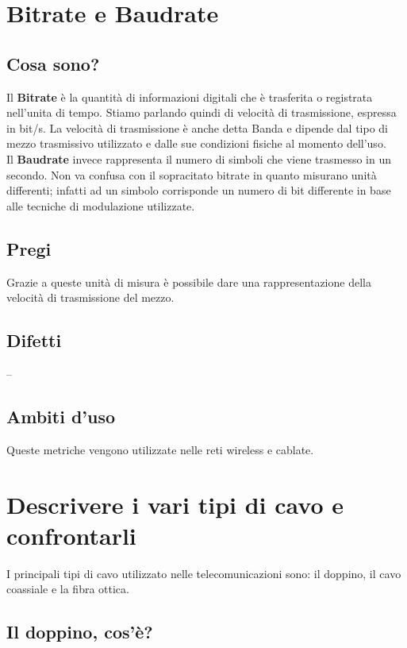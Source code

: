 \section{Bitrate e Baudrate}
\subsection{Cosa sono?}
Il \textbf{Bitrate} è la quantità di informazioni digitali che è trasferita o registrata nell’unita di tempo.
Stiamo parlando quindi di velocità di trasmissione, espressa in bit/s. La velocità di trasmissione è anche detta Banda e dipende dal tipo di mezzo trasmissivo utilizzato e dalle sue condizioni fisiche al momento dell’uso.
\\
Il \textbf{Baudrate} invece rappresenta il numero di simboli che viene trasmesso in un secondo. Non va confusa con il sopracitato bitrate in quanto misurano unità differenti; infatti ad un simbolo corrisponde un numero di bit differente in base alle tecniche di modulazione utilizzate.

\subsection{Pregi}
Grazie a queste unità di misura è possibile dare una rappresentazione della velocità di trasmissione del mezzo.

\subsection{Difetti}
--

\subsection{Ambiti d'uso}
Queste metriche vengono utilizzate nelle reti wireless e cablate.

\section{Descrivere i vari tipi di cavo e confrontarli}
I principali tipi di cavo utilizzato nelle telecomunicazioni sono: il doppino, il cavo coassiale e la fibra ottica. \\
\subsection{Il doppino, cos'è?}


